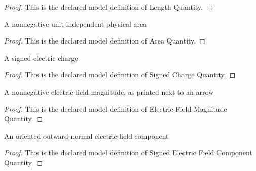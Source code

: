 \begin{proof}
  This is the declared model definition of Length Quantity.
\end{proof}
\begin{definition}
  \label{def:physics:phyx-mini-0841:phyxminiproblems-problemphyxmini0841-areaquantity}
  A nonnegative unit-independent physical area
\end{definition}
\begin{proof}
  This is the declared model definition of Area Quantity.
\end{proof}
\begin{definition}
  \label{def:physics:phyx-mini-0841:phyxminiproblems-problemphyxmini0841-signedchargequantity}
  A signed electric charge
\end{definition}
\begin{proof}
  This is the declared model definition of Signed Charge Quantity.
\end{proof}
\begin{definition}
  \label{def:physics:phyx-mini-0841:phyxminiproblems-problemphyxmini0841-electricfieldmagnitudequantity}
  A nonnegative electric-field magnitude, as printed next to an arrow
\end{definition}
\begin{proof}
  This is the declared model definition of Electric Field Magnitude Quantity.
\end{proof}
\begin{definition}
  \label{def:physics:phyx-mini-0841:phyxminiproblems-problemphyxmini0841-signedelectricfieldcomponentquantity}
  An oriented outward-normal electric-field component
\end{definition}
\begin{proof}
  This is the declared model definition of Signed Electric Field Component Quantity.
\end{proof}
